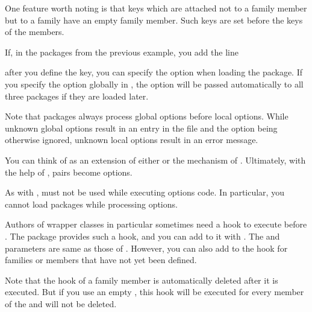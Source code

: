 One feature worth noting is that keys which are attached not to a family
member but to a family have an empty family member. Such keys are set before
the keys of the members.
\begin{Example}
  If, in the packages from the previous example, you add the line
\begin{lstcode}
\end{lstcode}
  after you define the key, you can specify the  option when
  loading the package. If you specify the option globally in
  , the option will be passed automatically to all three
  packages if they are loaded later.
\end{Example}
Note that packages always process global options
before local options. While unknown global options result in an entry in the
 file and the option being otherwise ignored, unknown local
options result in an error message.

You can think of  as an extension of either 
 or the  mechanism
of . Ultimately, with the help of
,  pairs become options.%

As with ,
 must not be used while executing options code.
In particular, you cannot load packages while processing options.%
%
\EndIndexGroup


\begin{Declaration}
\end{Declaration}
Authors of wrapper classes in particular
sometimes need a hook to execute  before
. The  package
provides such a hook, and you can add  to it with
. The  and 
parameters are same as those of .
However, you can also add  to the hook for families or members
that have not yet been defined.

Note that the hook of a family member is automatically deleted after it is
executed. But if you use an empty , this hook will
be executed for every member of the  and will not be deleted.

